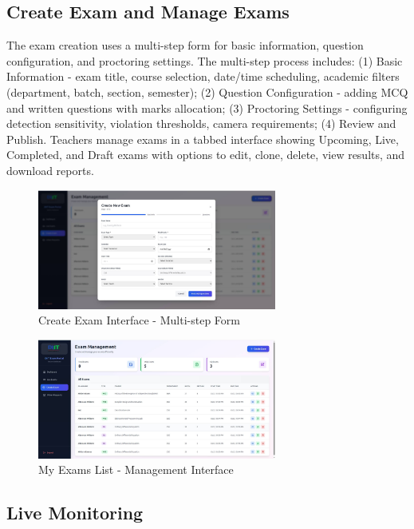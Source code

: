 \subsection{Create Exam and Manage Exams}

The exam creation uses a multi-step form for basic information, question configuration, and proctoring settings. The multi-step process includes: (1) Basic Information - exam title, course selection, date/time scheduling, academic filters (department, batch, section, semester); (2) Question Configuration - adding MCQ and written questions with marks allocation; (3) Proctoring Settings - configuring detection sensitivity, violation thresholds, camera requirements; (4) Review and Publish. Teachers manage exams in a tabbed interface showing Upcoming, Live, Completed, and Draft exams with options to edit, clone, delete, view results, and download reports.

\begin{figure}[p]
    \centering
    \includegraphics[width=0.7\textwidth]{Chap4/teacher_create_exam.jpg}
    \caption{Create Exam Interface - Multi-step Form}
    \label{fig:teacher_create}
\end{figure}

\begin{figure}[p]
    \centering
    \includegraphics[width=0.7\textwidth]{Chap4/teacher_my_exams.jpg}
    \caption{My Exams List - Management Interface}
    \label{fig:teacher_exams}
\end{figure}

\subsection{Live Monitoring}


